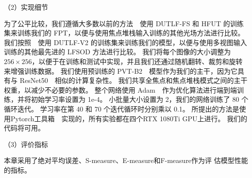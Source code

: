 （2）实现细节
%
%
\par
%
%
为了公平比较，我们遵循大多数以前的方法~\cite{piao2020exploit, liu2021light}~使用 DUTLF-FS 和 HFUT 的训练集来训练我们的 FPT，以便与使用焦点堆栈输入训练的其他光场方法进行比较。 我们按照~\cite{wang2022lfbcnet,jing2021occlusion}~使用 DUTLF-V2 的训练集来训练我们的模型，以便与使用多视图输入训练的其他最先进的 LFSOD 方法进行比较。 我们将每个图像的大小调整为 $256 \times 256$，以便于在训练和测试中实现，并且我们还通过随机翻转、裁剪和旋转来增强训练数据。
我们使用预训练的 PVT-B2~\cite{wang2022pvt}~模型作为我们的主干，因为它具有与 ResNet50~\cite{he2016deep}~相似的计算复杂性。 我们共享全焦点和焦点堆栈模式之间的主干权重，以减少不必要的参数。 整个网络使用 Adam~\cite{kingma2014adam}~作为优化算法进行端到端训练，并将初始学习率设置为 1e-4。 小批量大小设置为 2，我们的网络训练了 80 个循环迭代。 学习率在第 40 和 70 个迭代循环时分别乘以 0.1。 所提出的方法是使用Pytorch工具箱~\cite{paszke2017automatic}~实现的，所有实验都在四个RTX 1080Ti GPU上进行。 我们的代码将可用。 
%
%
%
%
%
\par
%
%
%
%
%
（3）评价指标
%
%
\par
%
%
本章采用了绝对平均误差、S-measure、E-measure和F-measure作为评
估模型性能的指标。







